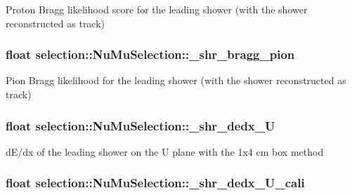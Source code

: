 Proton Bragg likelihood score for the leading shower (with the shower reconstructed as track) \hypertarget{classselection_1_1NuMuSelection_a965ff03e4cd45fa4a7267f2c4576c99e}{
\subsubsection[{\-\_\-shr\-\_\-bragg\-\_\-pion}]{\setlength{\rightskip}{0pt plus 5cm}float selection\-::\-Nu\-Mu\-Selection\-::\-\_\-shr\-\_\-bragg\-\_\-pion\hspace{0.3cm}{\ttfamily [private]}}}\label{classselection_1_1NuMuSelection_a965ff03e4cd45fa4a7267f2c4576c99e}
Pion Bragg likelihood for the leading shower (with the shower reconstructed as track) \hypertarget{classselection_1_1NuMuSelection_a208bf1de9d20aa592d340dd331d6a524}{
\subsubsection[{\-\_\-shr\-\_\-dedx\-\_\-\-U}]{\setlength{\rightskip}{0pt plus 5cm}float selection\-::\-Nu\-Mu\-Selection\-::\-\_\-shr\-\_\-dedx\-\_\-\-U\hspace{0.3cm}{\ttfamily [private]}}}\label{classselection_1_1NuMuSelection_a208bf1de9d20aa592d340dd331d6a524}
d\-E/dx of the leading shower on the U plane with the 1x4 cm box method \hypertarget{classselection_1_1NuMuSelection_a155e84bd4da519558ee39d6d9955e93b}{
\subsubsection[{\-\_\-shr\-\_\-dedx\-\_\-\-U\-\_\-cali}]{\setlength{\rightskip}{0pt plus 5cm}float selection\-::\-Nu\-Mu\-Selection\-::\-\_\-shr\-\_\-dedx\-\_\-\-U\-\_\-cali\hspace{0.3cm}{\ttfamily [private]}}}\label{classselection_1_1NuMuSelection_a155e84bd4da519558ee39d6d9955e93b}

